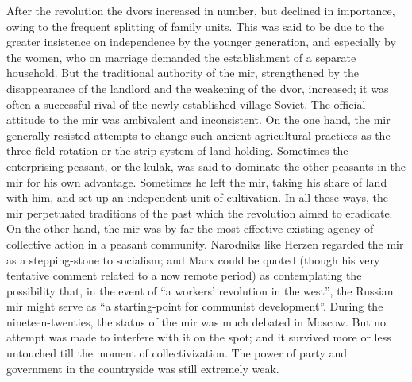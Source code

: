 After the revolution the dvors increased in number, but declined in importance, owing to the frequent splitting of family units. This was said to be due to the greater insistence on independence by the younger generation, and especially by the women, who on marriage demanded the establishment of a separate household. But the traditional authority of the mir, strengthened by the disappearance of the landlord and the weakening of the dvor, increased; it was often a successful rival of the newly established village Soviet. The official attitude to the mir was ambivalent and inconsistent. On the one hand, the mir generally resisted attempts to change such ancient agricultural practices as the three-field rotation or the strip system of land-holding. Sometimes the enterprising peasant, or the kulak, was said to dominate the other peasants in the mir for his own advantage. Sometimes he left the mir, taking his share of land with him, and set up an independent unit of cultivation. In all these ways, the mir perpetuated traditions of the past which the revolution aimed to eradicate. On the other hand, the mir was by far the most effective existing agency of collective action in a peasant community. Narodniks like Herzen regarded the mir as a stepping-stone to socialism; and Marx could be quoted (though his very tentative comment related to a now remote period) as contemplating the possibility that, in the event of ``a workers' revolution in the west'', the Russian mir might serve as ``a starting-point for communist development''. During the nineteen-twenties, the status of the mir was much debated in Moscow. But no attempt was made to interfere with it on the spot; and it survived more or less untouched till the moment of collectivization. The power of party and government in the countryside was still extremely weak. 

